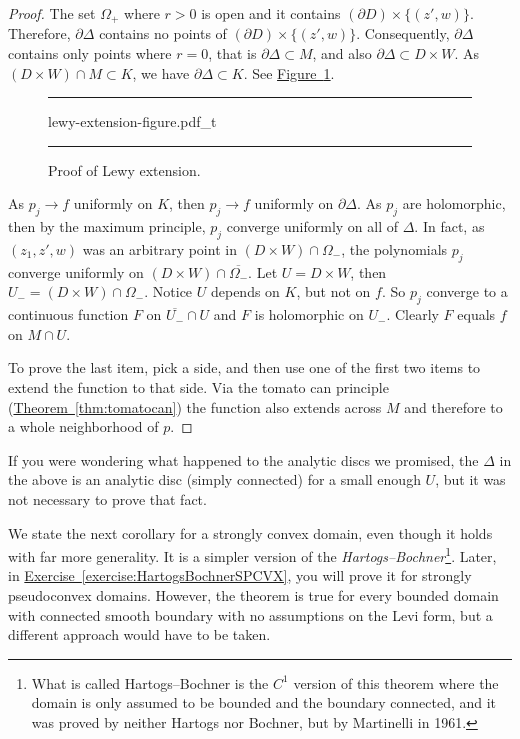 \documentclass[12pt,openany]{book}
\newcommand{\myindex}[1]{#1\index{#1}}
\theoremstyle{plain}
\theoremstyle{remark}
\theoremstyle{definition}
\newenvironment{myfig}{%
\begin{figure}[h!t]
\noindent\rule{\textwidth}{0.5pt}\vspace{12pt}\par\centering}%
{\par\noindent\rule{\textwidth}{0.5pt}
\end{figure}}
\theoremstyle{exercise}
\theoremstyle{example}
\newcommand{\figureref}[1]{\hyperref[#1]{Figure~\ref*{#1}}}
\newcommand{\exerciseref}[1]{\hyperref[#1]{Exercise~\ref*{#1}}}
\newcommand{\thmref}[1]{\hyperref[#1]{Theorem~\ref*{#1}}}
\begin{document}
\begin{proof}
The set $\Omega_+$ where $r > 0$ is open and it contains
$(\partial D) \times \{ (z',w) \}$.  Therefore,
$\partial \Delta$ contains no points of $(\partial D) \times \{ (z',w) \}$.
Consequently, $\partial \Delta$ contains only points where
$r = 0$, that is $\partial \Delta \subset M$, and
also
$\partial \Delta \subset D \times W$.
As $(D \times W) \cap M \subset K$, we have $\partial \Delta \subset K$.
See \figureref{fig:lewy-extension-figure}.

\begin{myfig}
{lewy-extension-figure.pdf_t}
\caption{Proof of Lewy extension.\label{fig:lewy-extension-figure}}
\end{myfig}

As $p_j \to f$ uniformly on $K$, then $p_j \to f$ uniformly on
$\partial \Delta$.  As  $p_j$ are holomorphic, then by the maximum
principle, $p_j$ converge uniformly on all of $\Delta$.  In fact, as $(z_1,z',w)$ was
an arbitrary point in $(D \times W) \cap \Omega_-$,
the polynomials $p_j$ converge uniformly on
$(D \times W) \cap \overline{\Omega_-}$.
Let $U = D \times W$, then $U_- = (D \times W) \cap \Omega_-$.  Notice 
$U$ depends on $K$, but not on $f$.
So $p_j$ converge to a continuous function $F$ on $\overline{U_-} \cap
U$ and $F$
is holomorphic on
$U_-$.  Clearly $F$ equals $f$ on $M \cap U$.

To prove the last item, pick a side, and then use one of the first two
items to extend the function to that side.  Via the tomato can
principle (\thmref{thm:tomatocan}) the function also extends across $M$ and
therefore to a whole neighborhood of $p$.
\end{proof}

If you were wondering what happened to the analytic discs we promised,
the $\Delta$ in the above is an analytic disc (simply connected) for a small enough $U$, but it was
not necessary to prove that fact.

We state the next corollary for a strongly convex domain, even though it
holds with far more generality.
It is a simpler version of the \emph{\myindex{Hartogs--Bochner}}\footnote{What is called
Hartogs--Bochner is 
the $C^1$ version of this theorem where the domain is only assumed to be bounded
and the boundary connected,
and it was proved by neither Hartogs nor
Bochner, but by Martinelli in 1961.}.
Later, in \exerciseref{exercise:HartogsBochnerSPCVX},
you will prove it for strongly pseudoconvex
domains.  However, the theorem is true for every bounded domain with connected smooth
boundary
with no assumptions on the Levi form, but 
a different approach would have to be taken.
\end{document}
